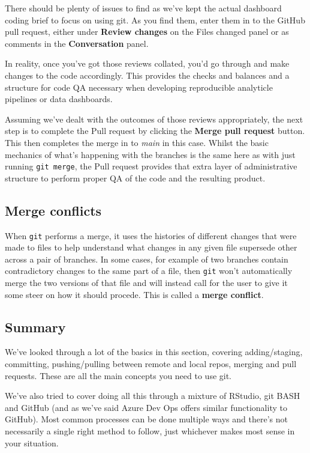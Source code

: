 \documentclass[
  12pt,
]{article}
\begin{document}
There should be plenty of issues to find as we've kept the actual
dashboard coding brief to focus on using git. As you find them, enter
them in to the GitHub pull request, either under \textbf{Review changes}
on the Files changed panel or as comments in the \textbf{Conversation}
panel.

In reality, once you've got those reviews collated, you'd go through and
make changes to the code accordingly. This provides the checks and
balances and a structure for code QA necessary when developing
reproducible analyticle pipelines or data dashboards.

Assuming we've dealt with the outcomes of those reviews appropriately,
the next step is to complete the Pull request by clicking the
\textbf{Merge pull request} button. This then completes the merge in to
\emph{main} in this case. Whilst the basic mechanics of what's happening
with the branches is the same here as with just running
\texttt{git\ merge}, the Pull request provides that extra layer of
administrative structure to perform proper QA of the code and the
resulting product.

\hypertarget{merge-conflicts}{%
\subsection{Merge conflicts}\label{merge-conflicts}}

When \texttt{git} performs a merge, it uses the histories of different
changes that were made to files to help understand what changes in any
given file supersede other across a pair of branches. In some cases, for
example of two branches contain contradictory changes to the same part
of a file, then \texttt{git} won't automatically merge the two versions
of that file and will instead call for the user to give it some steer on
how it should procede. This is called a \textbf{merge conflict}.

\hypertarget{summary-1}{%
\subsection{Summary}\label{summary-1}}

We've looked through a lot of the basics in this section, covering
adding/staging, committing, pushing/pulling between remote and local
repos, merging and pull requests. These are all the main concepts you
need to use git.

We've also tried to cover doing all this through a mixture of RStudio,
git BASH and GitHub (and as we've said Azure Dev Ops offers similar
functionality to GitHub). Most common processes can be done multiple
ways and there's not necessarily a single right method to follow, just
whichever makes most sense in your situation.
\end{document}
